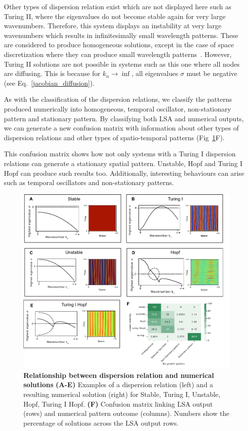 Other types of dispersion relation exist which are not displayed here such as Turing II, where the eigenvalues do not become stable again for very large wavenumbers.
Therefore, this system displays an instability at very large wavenumbers which results in infinitesimally small wavelength patterns.
These are considered to produce homogeneous solutions, except in the case of space discretization where they can produce small wavelength patterns~\parencite{Wang2022}.
However, Turing II solutions are not possible in systems such as this one where all nodes are diffusing.
This is because for $k_n \rightarrow \inf$, all eigenvalues $\sigma$ must be negative (see Eq.~\ref{jacobian_diffusion}).

As with the classification of the dispersion relations, we classify the patterns produced numerically into homogeneous, temporal oscillator, non-stationary pattern and stationary pattern.
By classifying both LSA and numerical outputs, we can generate a new confusion matrix with information about other types of dispersion relations and other types of spatio-temporal patterns (Fig~\ref{fig:dispersions}F).

This confusion matrix shows how not only systems with a Turing I dispersion relations can generate a stationary spatial pattern. Unstable, Hopf and Turing I Hopf can produce such results too. Additionally, interesting behaviours can arise such as temporal oscillators and non-stationary patterns.

\begin{figure}[H]
    \includegraphics[width=1\textwidth]{figures/dispersion} %
    \caption{\textbf{Relationship between dispersion relation and numerical solutions} \textbf{(A-E)} Examples of a dispersion relation (left) and a resulting numerical solution (right) for Stable, Turing I, Unstable, Hopf, Turing I Hopf. \textbf{(F)} Confusion matrix linking LSA output (rows) and numerical pattern outcome (columns). Numbers show the percentage of solutions across the LSA output rows.}
    \label{fig:dispersions} %
\end{figure}

